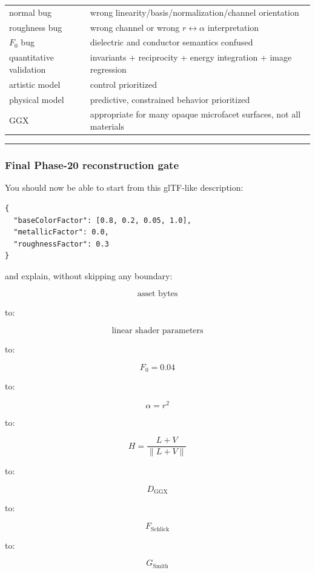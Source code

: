 {\begin{longtable}[]{@{}
  >{\raggedright\arraybackslash}p{}
  >{\raggedright\arraybackslash}p{}@{}}
normal bug & wrong linearity/basis/normalization/channel orientation \\
roughness bug & wrong channel or wrong \(r\leftrightarrow\alpha\) interpretation \\
\(F_0\) bug & dielectric and conductor semantics confused \\
quantitative validation & invariants + reciprocity + energy integration + image regression \\
artistic model & control prioritized \\
physical model & predictive, constrained behavior prioritized \\
GGX & appropriate for many opaque microfacet surfaces, not all materials \\
\end{longtable}
}

\begin{center}\rule{0.5\linewidth}{0.5pt}\end{center}

\subsubsection{Final Phase-20 reconstruction gate}\label{final-phase-20-reconstruction-gate}

You should now be able to start from this glTF-like description:

\begin{verbatim}
{
  "baseColorFactor": [0.8, 0.2, 0.05, 1.0],
  "metallicFactor": 0.0,
  "roughnessFactor": 0.3
}
\end{verbatim}

and explain, without skipping any boundary:

\[
\text{asset bytes}
\]

to:

\[
\text{linear shader parameters}
\]

to:

\[
F_0=0.04
\]

to:

\[
\alpha=r^2
\]

to:

\[
H=\frac{L+V}{\|L+V\|}
\]

to:

\[
D_{\mathrm{GGX}}
\]

to:

\[
F_{\mathrm{Schlick}}
\]

to:

\[
G_{\mathrm{Smith}}
\]

